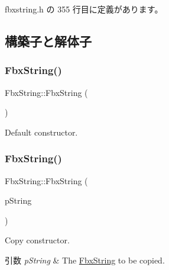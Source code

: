  fbxstring.\+h の 355 行目に定義があります。



\subsection{構築子と解体子}
\mbox{\label{class_fbx_string_af7a39b49d5e2238203b42c830a6a28f3}} 
\subsubsection{\texorpdfstring{Fbx\+String()}{FbxString()}\hspace{0.1cm}{\footnotesize\ttfamily [1/8]}}
{\footnotesize\ttfamily Fbx\+String\+::\+Fbx\+String (\begin{DoxyParamCaption}{ }\end{DoxyParamCaption})}



Default constructor. 

\mbox{\label{class_fbx_string_a7d4974cb96793041faf74947ddebd4ce}} 
\subsubsection{\texorpdfstring{Fbx\+String()}{FbxString()}\hspace{0.1cm}{\footnotesize\ttfamily [2/8]}}
{\footnotesize\ttfamily Fbx\+String\+::\+Fbx\+String (\begin{DoxyParamCaption}\item[{const \hyperlink{class_fbx_string}{Fbx\+String} \&}]{p\+String }\end{DoxyParamCaption})}

Copy constructor. 
\begin{DoxyParams}{引数}
{\em p\+String} & The \hyperlink{class_fbx_string}{Fbx\+String} to be copied. \\
\hline
\end{DoxyParams}
\mbox{\label{class_fbx_string_ac13dc02cce30f3c297a7f38019dc38ab}} 
